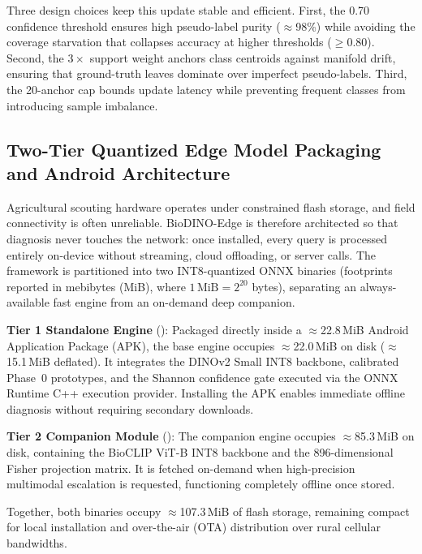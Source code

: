 \documentclass[preprint,12pt]{elsarticle}
\begin{document}
Three design choices keep this update stable and efficient. First, the 0.70 confidence threshold ensures high pseudo-label purity ($\approx$98\%) while avoiding the coverage starvation that collapses accuracy at higher thresholds ($\ge$0.80). Second, the $3\times$ support weight anchors class centroids against manifold drift, ensuring that ground-truth leaves dominate over imperfect pseudo-labels. Third, the 20-anchor cap bounds update latency while preventing frequent classes from introducing sample imbalance.

\subsection{Two-Tier Quantized Edge Model Packaging and Android Architecture}
\label{sec:packaging}
Agricultural scouting hardware operates under constrained flash storage, and field connectivity is often unreliable. BioDINO-Edge is therefore architected so that diagnosis never touches the network: once installed, every query is processed entirely on-device without streaming, cloud offloading, or server calls. The framework is partitioned into two INT8-quantized ONNX binaries (footprints reported in mebibytes (MiB), where $1\,\text{MiB} = 2^{20}$ bytes), separating an always-available fast engine from an on-demand deep companion.

\textbf{Tier 1 Standalone Engine} (): Packaged directly inside a $\approx$22.8\,MiB Android Application Package (APK), the base engine occupies $\approx$22.0\,MiB on disk ($\approx$15.1\,MiB deflated). It integrates the DINOv2 Small INT8 backbone, calibrated Phase~0 prototypes, and the Shannon confidence gate executed via the ONNX Runtime C++ execution provider. Installing the APK enables immediate offline diagnosis without requiring secondary downloads.

\textbf{Tier 2 Companion Module} (): The companion engine occupies $\approx$85.3\,MiB on disk, containing the BioCLIP ViT-B INT8 backbone and the 896-dimensional Fisher projection matrix. It is fetched on-demand when high-precision multimodal escalation is requested, functioning completely offline once stored.

Together, both binaries occupy $\approx$107.3\,MiB of flash storage, remaining compact for local installation and over-the-air (OTA) distribution over rural cellular bandwidths.

\end{document}
